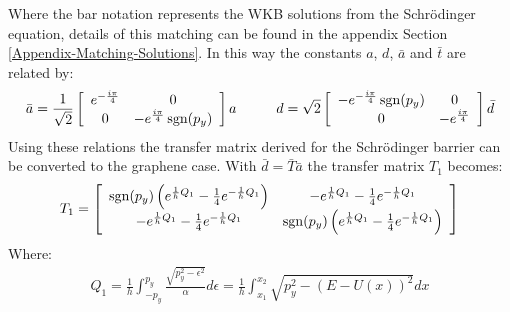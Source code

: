 		Where the bar notation represents the WKB solutions from the Schr\"{o}dinger equation, details of this matching can be found in the appendix Section \ref{Appendix-Matching-Solutions}. In this way the constants $a$, $d$, $\bar{a}$ and $\bar{t}$ are related by:
		\begin{align}
			\bar{a}=\frac{1}{\sqrt{2}}
			\left[\begin{array}{cc}
				e^{-\frac{i\pi}{4}}		&	0\\
				0	&	-e^{\frac{i\pi}{4}}\operatorname{sgn}(p_{y})
			\end{array}\right]a\hspace{1cm}
			d=\sqrt{2}
			\left[\begin{array}{cc}
				-e^{-\frac{i\pi}{4}}\operatorname{sgn}(p_{y})	&	0\\
				0	&	-e^{\frac{i\pi}{4}}
			\end{array}\right]\bar{d}
		\end{align}
		Using these relations the transfer matrix derived for the Schr{\" o}dinger barrier can be converted to the graphene case. With $\bar{d}=\bar{T}\bar{a}$ the transfer matrix $T_{1}$ becomes:
		\begin{align}
			T_{1}=\left[\begin{array}{cc}
				\operatorname{sgn}(p_{y})\left(e^{\frac{1}{h}Q_{1}}-\frac{1}{4}e^{-\frac{1}{h}Q_{1}}\right)	&	-e^{\frac{1}{h}Q_{1}}-\frac{1}{4}e^{-\frac{1}{h}Q_{1}}\\
				-e^{\frac{1}{h}Q_{1}}-\frac{1}{4}e^{-\frac{1}{h}Q_{1}}	&	\operatorname{sgn}(p_{y})\left(e^{\frac{1}{h}Q_{1}}-\frac{1}{4}e^{-\frac{1}{h}Q_{1}}\right)
			\end{array}\right]
		\end{align}
		Where:
		\begin{align}
			Q_{1}=\frac{1}{h}\int^{p_{y}}_{-p_{y}}\frac{\sqrt{p_{y}^{2}-\epsilon^{2}}}{\alpha}d\epsilon=\frac{1}{h}\int^{x_{2}}_{x_{1}}\sqrt{p_{y}^{2}-\left(E-U\left(x\right)\right)^{2}}dx
		\end{align}
